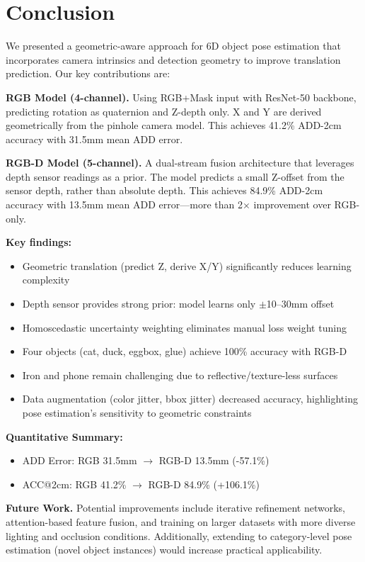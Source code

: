 \section{Conclusion}
\label{sec:conclusion}

We presented a geometric-aware approach for 6D object pose estimation that incorporates camera intrinsics and detection geometry to improve translation prediction. Our key contributions are:

\textbf{RGB Model (4-channel).} Using RGB+Mask input with ResNet-50 backbone, predicting rotation as quaternion and Z-depth only. X and Y are derived geometrically from the pinhole camera model. This achieves 41.2\% ADD-2cm accuracy with 31.5mm mean ADD error.

\textbf{RGB-D Model (5-channel).} A dual-stream fusion architecture that leverages depth sensor readings as a prior. The model predicts a small Z-offset from the sensor depth, rather than absolute depth. This achieves 84.9\% ADD-2cm accuracy with 13.5mm mean ADD error---more than 2$\times$ improvement over RGB-only.

\textbf{Key findings:}
\begin{itemize}
    \item Geometric translation (predict Z, derive X/Y) significantly reduces learning complexity
    \item Depth sensor provides strong prior: model learns only $\pm$10--30mm offset
    \item Homoscedastic uncertainty weighting eliminates manual loss weight tuning
    \item Four objects (cat, duck, eggbox, glue) achieve 100\% accuracy with RGB-D
    \item Iron and phone remain challenging due to reflective/texture-less surfaces
    \item Data augmentation (color jitter, bbox jitter) decreased accuracy, highlighting pose estimation's sensitivity to geometric constraints
\end{itemize}

\textbf{Quantitative Summary:}
\begin{itemize}
    \item ADD Error: RGB 31.5mm $\rightarrow$ RGB-D 13.5mm (-57.1\%)
    \item ACC@2cm: RGB 41.2\% $\rightarrow$ RGB-D 84.9\% (+106.1\%)
\end{itemize}

\textbf{Future Work.} Potential improvements include iterative refinement networks, attention-based feature fusion, and training on larger datasets with more diverse lighting and occlusion conditions. Additionally, extending to category-level pose estimation (novel object instances) would increase practical applicability.
